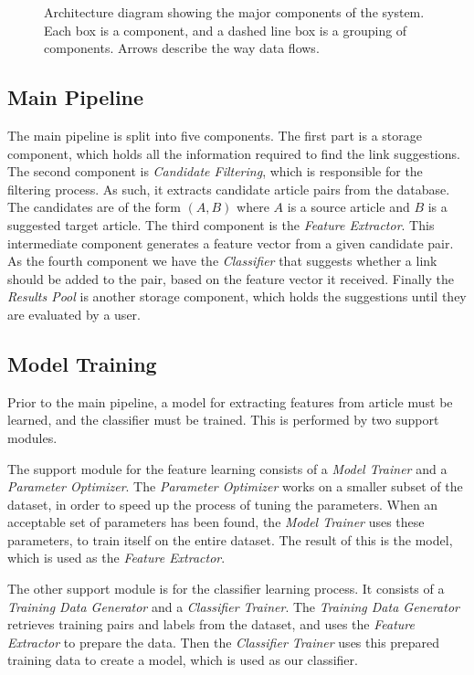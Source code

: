 \begin{figure}[tb]%
  \centering
  
\caption[Architecture diagram showing the major components of the system]{Architecture diagram showing the major components of the system. Each box is a component, and a dashed line box is a grouping of components. Arrows describe the way data flows.}%
\label{fig:system-overview}%
\end{figure}

\subsection{Main Pipeline}
The main pipeline is split into five components. The first part is a storage component, which holds all the information required to find the link suggestions. The second component is \emph{Candidate Filtering}, which is responsible for the filtering process. As such, it extracts candidate article pairs from the database. The candidates are of the form $(A,B)$ where $A$ is a source article and $B$ is a suggested target article. The third component is the \emph{Feature Extractor}. This intermediate component generates a feature vector from a given candidate pair. As the fourth component we have the \emph{Classifier} that suggests whether a link should be added to the pair, based on the feature vector it received. Finally the \emph{Results Pool} is another storage component, which holds the suggestions until they are evaluated by a user.

\subsection{Model Training}
Prior to the main pipeline, a model for extracting features from article must be learned, and the classifier must be trained. This is performed by two support modules.

The support module for the feature learning consists of a \emph{Model Trainer} and a \emph{Parameter Optimizer}. The \emph{Parameter Optimizer} works on a smaller subset of the dataset, in order to speed up the process of tuning the parameters. When an acceptable set of parameters has been found, the \emph{Model Trainer} uses these parameters, to train itself on the entire dataset. The result of this is the model, which is used as the \emph{Feature Extractor}.

The other support module is for the classifier learning process. It consists of a \emph{Training Data Generator} and a \emph{Classifier Trainer}. The \emph{Training Data Generator} retrieves training pairs and labels from the dataset, and uses the \emph{Feature Extractor} to prepare the data. Then the \emph{Classifier Trainer} uses this prepared training data to create a model, which is used as our classifier.

